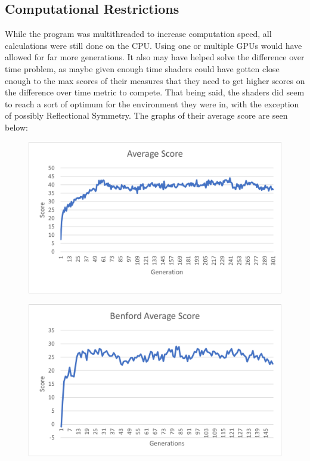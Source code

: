 \documentclass{acmart}
\begin{document}
\subsection*{Computational Restrictions}
While the program was multithreaded to increase computation speed, all calculations were still done on the CPU. Using one or multiple GPUs would have allowed for far more generations. It also may have 
helped solve the difference over time problem, as maybe given enough time shaders could have gotten close enough to the max scores of their measures that they need to get higher scores on the difference over time metric to compete.
That being said, the shaders did seem to reach a sort of optimum for the environment they were in, with the exception of possibly Reflectional Symmetry. The graphs of their average score 
are seen below: 

\begin{figure}[h!]
    \includegraphics[width =\textwidth]{Shannon_AvgScoreGen.png}
\end{figure}

\begin{figure}[h!]
    \includegraphics[width =\textwidth]{Benford_AvgScoreGen.png}
\end{figure}
\end{document}

